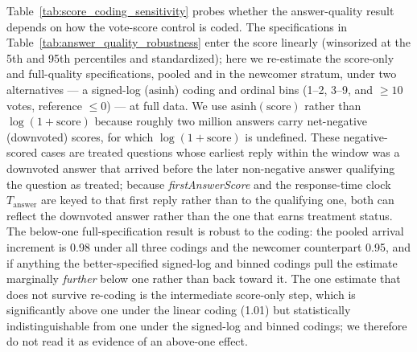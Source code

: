 Table~\ref{tab:score_coding_sensitivity} probes whether the answer-quality result depends on how the vote-score control is coded. The specifications in Table~\ref{tab:answer_quality_robustness} enter the score linearly (winsorized at the 5th and 95th percentiles and standardized); here we re-estimate the score-only and full-quality specifications, pooled and in the newcomer stratum, under two alternatives --- a signed-log ($\mathrm{asinh}$) coding and ordinal bins (1--2, 3--9, and $\ge 10$ votes, reference $\le 0$) --- at full data. We use $\mathrm{asinh}(\mathrm{score})$ rather than $\log(1+\mathrm{score})$ because roughly two million answers carry net-negative (downvoted) scores, for which $\log(1+\mathrm{score})$ is undefined. These negative-scored cases are treated questions whose earliest reply within the window was a downvoted answer that arrived before the later non-negative answer qualifying the question as treated; because \textit{firstAnswerScore} and the response-time clock $T_{\text{answer}}$ are keyed to that first reply rather than to the qualifying one, both can reflect the downvoted answer rather than the one that earns treatment status. The below-one full-specification result is robust to the coding: the pooled arrival increment is 0.98 under all three codings and the newcomer counterpart 0.95, and if anything the better-specified signed-log and binned codings pull the estimate marginally \emph{further} below one rather than back toward it. The one estimate that does not survive re-coding is the intermediate score-only step, which is significantly above one under the linear coding (1.01) but statistically indistinguishable from one under the signed-log and binned codings; we therefore do not read it as evidence of an above-one effect.



